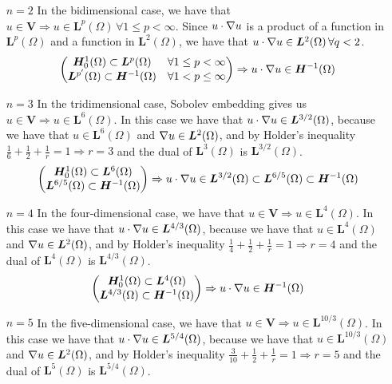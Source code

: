\begin{itemize}
    \item[\(n = 2\)] In the bidimensional case, we have that \(u \in \bm{V} \Rightarrow u \in \bm{L}^p(\Omega) \, \forall 1 \leq p < \infty\). Since \(u \cdot \nabla u\) is a product of a function in \(\bm{L}^p(\Omega)\) and a function in \(\bm{L}^2(\Omega)\), we have that \(u \cdot \nabla u \in \bm{L}^2(\Omega) \, \forall q < 2\).
    \[
        \begin{pmatrix*}
            \bm{H}^1_0(\Omega) \subset \bm{L}^p{(\Omega)} & \forall 1 \leq p < \infty \\
            \bm{L}^{p'}(\Omega) \subset \bm{H}^{-1}(\Omega) & \forall 1 < p \leq \infty
        \end{pmatrix*}
        \Rightarrow u \cdot \grad u \in \bm{H}^{-1}(\Omega)
    \]
    \item[\(n = 3\)] In the tridimensional case, Sobolev embedding gives us \(u \in \bm{V} \Rightarrow u \in \bm{L}^6(\Omega)\). In this case we have that \(u \cdot \nabla u \in \bm{L}^{3/2}(\Omega)\), because we have that \(u \in \bm{L}^6(\Omega)\) and \(\nabla u \in \bm{L}^2(\Omega)\), and by Holder's inequality \(\frac{1}{6} + \frac{1}{2} + \frac{1}{r} = 1 \Rightarrow r = 3\) and the dual of \(\bm{L}^{3}(\Omega)\) is \(\bm{L}^{3/2}(\Omega)\).
    \[
        \begin{pmatrix*}
            \bm{H}^1_0(\Omega) \subset \bm{L}^6{(\Omega)}  \\
            \bm{L}^{6/5}(\Omega) \subset \bm{H}^{-1}(\Omega)
        \end{pmatrix*}
        \Rightarrow u \cdot \grad u \in \bm{L}^{3/2}(\Omega) \subset \bm{L}^{6/5}(\Omega) \subset \bm{H}^{-1}(\Omega)
    \]
    \item[\(n = 4\)] In the four-dimensional case, we have that \(u \in \bm{V} \Rightarrow u \in \bm{L}^4(\Omega)\). In this case we have that \(u \cdot \nabla u \in \bm{L}^{4/3}(\Omega)\), because we have that \(u \in \bm{L}^4(\Omega)\) and \(\nabla u \in \bm{L}^2(\Omega)\), and by Holder's inequality \(\frac{1}{4} + \frac{1}{2} + \frac{1}{r} = 1 \Rightarrow r = 4\) and the dual of \(\bm{L}^{4}(\Omega)\) is \(\bm{L}^{4/3}(\Omega)\).
    \[
        \begin{pmatrix*}
            \bm{H}^1_0(\Omega) \subset \bm{L}^4{(\Omega)}  \\
            \bm{L}^{4/3}(\Omega) \subset \bm{H}^{-1}(\Omega)
        \end{pmatrix*}
        \Rightarrow u \cdot \grad u \in \bm{H}^{-1}(\Omega)
    \]
    \item[\(n = 5\)] In the five-dimensional case, we have that \(u \in \bm{V} \Rightarrow u \in \bm{L}^{10/3}(\Omega)\). In this case we have that \(u \cdot \nabla u \in \bm{L}^{5/4}(\Omega)\), because we have that \(u \in \bm{L}^{10/3}(\Omega)\) and \(\nabla u \in \bm{L}^2(\Omega)\), and by Holder's inequality \(\frac{3}{10} + \frac{1}{2} + \frac{1}{r} = 1 \Rightarrow r = 5\) and the dual of \(\bm{L}^{5}(\Omega)\) is \(\bm{L}^{5/4}(\Omega)\).

\end{itemize}
